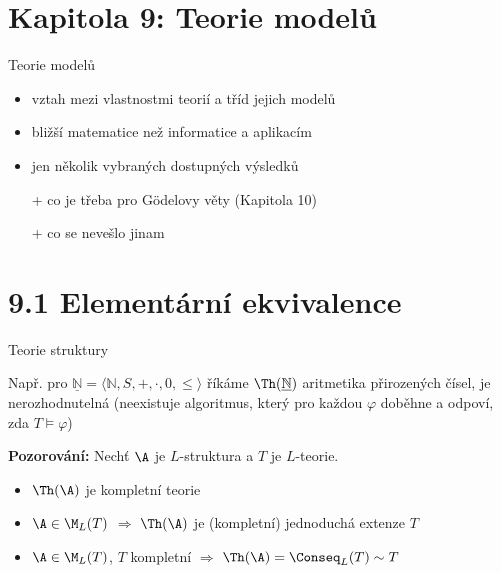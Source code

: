 \documentclass{beamer}
\begin{document}
\section{\sc Kapitola 9: Teorie modelů}


\begin{frame}{Teorie modelů}

    \begin{itemize}
        \item vztah mezi vlastnostmi teorií a tříd jejich modelů
        \item bližší matematice než informatice a aplikacím
        \item jen několik vybraných dostupných výsledků
        \item[+] co je třeba pro Gödelovy věty (Kapitola 10)
        \item[+] co se nevešlo jinam 
    \end{itemize}

\end{frame}


\section{9.1 Elementární ekvivalence}


\begin{frame}{Teorie struktury}


    \medskip

    Např.  pro  $\underline{\mathbb{N}}=\langle\mathbb{N},S,+,\cdot,0,\le\rangle$ říkáme $\Th(\underline{\mathbb{N}})$ \alert{aritmetika přirozených čísel}, je \alert{nerozhodnutelná} (neexistuje algoritmus, který pro každou $\varphi$ doběhne a odpoví, zda $T\models\varphi$)

    \medskip

    \textbf{Pozorování:} Nechť $\A$ je $L$-struktura a $T$ je $L$-teorie.
    \begin{itemize}
        \item $\Th(\A)$ je kompletní teorie
        \item $\A\in\M_L(T)$ $\Rightarrow$ $\Th(\A)$ je (kompletní) jednoduchá extenze $T$
        \item $\A\in\M_L(T)$, $T$ kompletní $\Rightarrow$ $\Th(\A)=\Conseq_L(T)\sim T$
    \end{itemize}

\end{frame}
\end{document}
